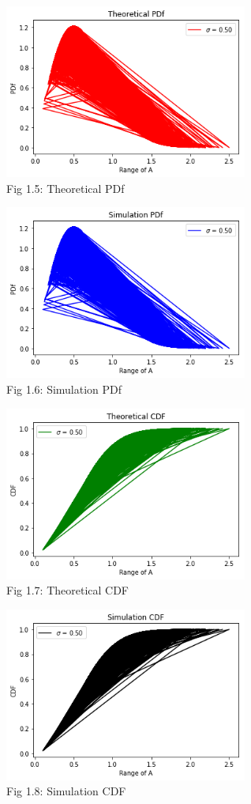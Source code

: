 \documentclass[journal,12pt,twocolumn]{IEEEtran}
\begin{document}
\begin{figure}[h!]
    \includegraphics[width=8cm]{Assignment-1/Codes/Figures/theo_pdf.png}
    \caption*{Fig 1.5: Theoretical PDf}
\end{figure}
\begin{figure}[h!]
    \includegraphics[width=8cm]{Assignment-1/Codes/Figures/simul_pdf.png}
    \caption*{Fig 1.6: Simulation PDf}
\end{figure}
\begin{figure}[h!]
    \includegraphics[width=8cm]{Assignment-1/Codes/Figures/theo_cdf.png}
    \caption*{Fig 1.7: Theoretical CDF}
\end{figure}
\begin{figure}[h!]
    \includegraphics[width=8cm]{Assignment-1/Codes/Figures/simul_cdf.png}
    \caption*{Fig 1.8: Simulation CDF}
\end{figure}
\end{document}
